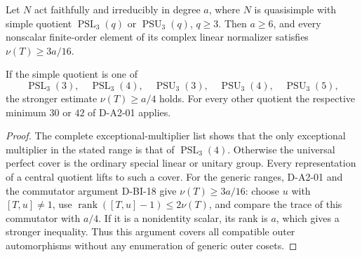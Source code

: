 \begin{lemma}[D-A2-02]
\label{D-A2-02}
Let $N$ act faithfully and irreducibly in degree $a$, where $N$ is
quasisimple with simple quotient $\operatorname{PSL}_3(q)$ or
$\operatorname{PSU}_3(q)$, $q\ge3$.  Then $a\ge6$, and every
nonscalar finite-order element of its complex linear normalizer
satisfies $\nu(T)\ge3a/16$.

If the simple quotient is one of
\[
 \operatorname{PSL}_3(3),\quad\operatorname{PSL}_3(4),\quad
 \operatorname{PSU}_3(3),\quad\operatorname{PSU}_3(4),\quad
 \operatorname{PSU}_3(5),                                  \tag{A2.5}
\]
the stronger estimate $\nu(T)\ge a/4$ holds.
For every other quotient the respective minimum $30$ or $42$
of D-A2-01 applies.
\end{lemma}

\begin{proof}
The complete exceptional-multiplier list
\cite[Chapter~5, Table~1, numbered p.~35]{BI:HHM} shows that the
only exceptional multiplier in the stated range is that of
$\operatorname{PSL}_3(4)$.  Otherwise the universal perfect cover
is the ordinary special linear or unitary group.  Every
representation of a central quotient lifts to such a cover.
For the generic ranges, D-A2-01 and the commutator argument
D-BI-18 give $\nu(T)\ge3a/16$: choose $u$ with $[T,u]\ne1$,
use $\operatorname{rank}([T,u]-1)\le2\nu(T)$, and compare
the trace of this commutator with $a/4$.  If it is a nonidentity
scalar, its rank is $a$, which gives a stronger inequality.
Thus this argument covers all compatible outer automorphisms
without any enumeration of generic outer cosets.


\end{proof}

